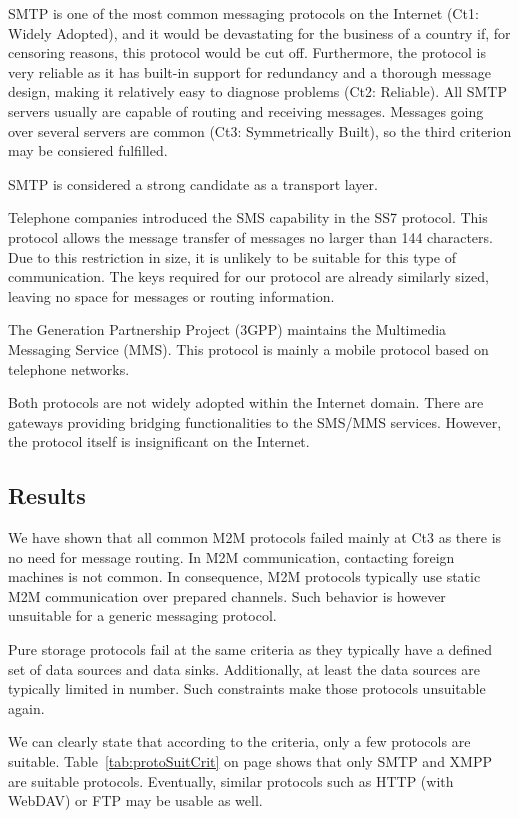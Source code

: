 SMTP is one of the most common messaging protocols on the Internet (Ct1: Widely Adopted), and it would be devastating for the business of a country if, for censoring reasons, this protocol would be cut off. Furthermore, the protocol is very reliable as it has built-in support for redundancy and a thorough message design, making it relatively easy to diagnose problems (Ct2: Reliable). All SMTP servers usually are capable of routing and receiving messages. Messages going over several servers are common (Ct3: Symmetrically Built), so the third criterion may be consiered fulfilled.

SMTP is considered a strong candidate as a transport layer.  

Telephone companies introduced the SMS capability in the SS7 protocol. This protocol allows the message transfer of messages no larger than 144 characters. Due to this restriction in size, it is unlikely to be suitable for this type of communication. The keys required for our protocol are already similarly sized, leaving no space for messages or routing information.

The  Generation Partnership Project (3GPP) maintains the Multimedia Messaging Service (MMS). This protocol is mainly a mobile protocol based on telephone networks.

Both protocols are not widely adopted within the Internet domain. There are gateways providing bridging functionalities to the SMS/MMS services. However, the protocol itself is insignificant on the Internet. 

\subsection{Results}
We have shown that all common M2M protocols failed mainly at Ct3 as there is no need for message routing. In M2M communication, contacting foreign machines is not common. In consequence, M2M protocols typically use static M2M communication over prepared channels. Such behavior is however unsuitable for a generic messaging protocol.

Pure storage protocols fail at the same criteria as they typically have a defined set of data sources and data sinks. Additionally, at least the data sources are typically limited in number. Such constraints make those protocols unsuitable again.

We can clearly state that according to the criteria, only a few protocols are suitable. Table~\ref{tab:protoSuitCrit} on page \pageref{tab:protoSuitCrit} shows that only SMTP and XMPP are suitable protocols. Eventually, similar protocols such as HTTP (with WebDAV) or FTP may be usable as well. 

